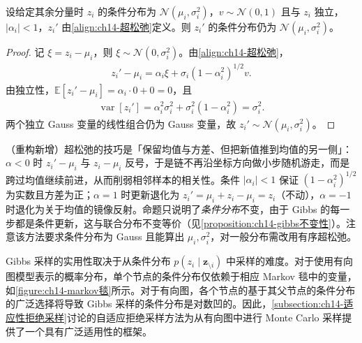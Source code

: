 \documentclass[../../main.tex]{subfiles}
\begin{document}
\begin{proposition}[超松弛更新保持条件分布]\label{proposition:ch14-超松弛不变}
设给定其余分量时 $z_{i}$ 的条件分布为 $\mathcal{N}\!\left(\mu_{i},\sigma_{i}^{2}\right)$，$v\sim\mathcal{N}(0,1)$ 且与 $z_{i}$ 独立，$\left|\alpha_{i}\right|<1$，$z_{i}'$ 由\eqref{align:ch14-超松弛}定义。则 $z_{i}'$ 的条件分布仍为 $\mathcal{N}\!\left(\mu_{i},\sigma_{i}^{2}\right)$。
\end{proposition}

\begin{proof}
记 $\xi=z_{i}-\mu_{i}$，则 $\xi\sim\mathcal{N}\!\left(0,\sigma_{i}^{2}\right)$。由\eqref{align:ch14-超松弛}，
\begin{align*}
z_{i}'-\mu_{i}=\alpha_{i}\xi+\sigma_{i}\left(1-\alpha_{i}^{2}\right)^{1/2}v.
\end{align*}
由独立性，$\mathbb{E}\left[z_{i}'-\mu_{i}\right]=\alpha_{i}\cdot0+0=0$，且
\begin{align*}
\operatorname{var}\left[z_{i}'\right]=\alpha_{i}^{2}\sigma_{i}^{2}+\sigma_{i}^{2}\left(1-\alpha_{i}^{2}\right)=\sigma_{i}^{2}.
\end{align*}
两个独立 Gauss 变量的线性组合仍为 Gauss 变量，故 $z_{i}'\sim\mathcal{N}\!\left(\mu_{i},\sigma_{i}^{2}\right)$。
\end{proof}

\begin{remark}（重构新增）超松弛的技巧是「保留均值与方差、但把新值推到均值的另一侧」：$\alpha<0$ 时 $z_{i}'-\mu_{i}$ 与 $z_{i}-\mu_{i}$ 反号，于是链不再沿坐标方向做小步随机游走，而是跨过均值继续前进，从而削弱相邻样本的相关性。条件 $\left|\alpha_{i}\right|<1$ 保证 $\left(1-\alpha_{i}^{2}\right)^{1/2}$ 为实数且方差为正；$\alpha=1$ 时更新退化为 $z_{i}'=\mu_{i}+z_{i}-\mu_{i}=z_{i}$（不动），$\alpha=-1$ 时退化为关于均值的镜像反射。命题只说明了\emph{条件分布}不变，由于 Gibbs 的每一步都是条件更新，这与联合分布不变等价（见\cref{proposition:ch14-gibbs不变性}）。注意该方法要求条件分布为 Gauss 且能算出 $\mu_{i},\sigma_{i}^{2}$，对一般分布需改用有序超松弛。
\end{remark}

Gibbs 采样的实用性取决于从条件分布 $p\!\left(z_{i}\mid\bm{z}_{\setminus i}\right)$ 中采样的难度。对于使用有向图模型表示的概率分布，单个节点的条件分布仅依赖于相应 Markov 毯中的变量，如\cref{figure:ch14-markov毯}所示。对于有向图，各个节点的基于其父节点的条件分布的广泛选择将导致 Gibbs 采样的条件分布是对数凹的。因此，\cref{subsection:ch14-适应性拒绝采样}讨论的自适应拒绝采样方法为从有向图中进行 Monte Carlo 采样提供了一个具有广泛适用性的框架。
\end{document}
